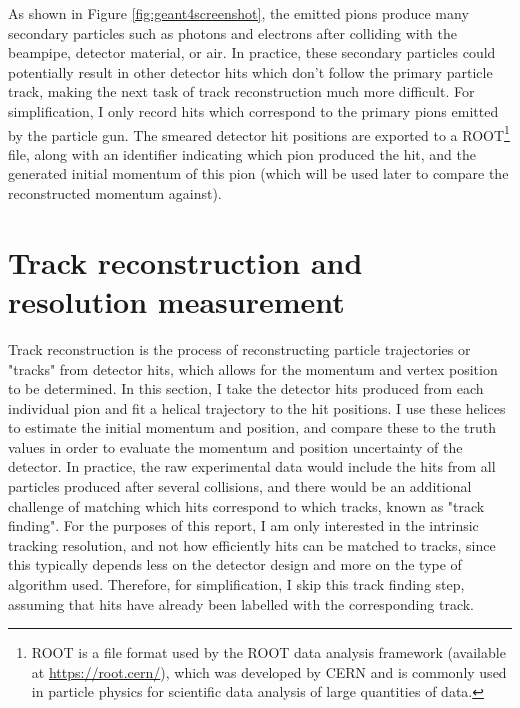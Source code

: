 \documentclass[titlepage]{article}[11pt]
\begin{document}
As shown in Figure \ref{fig:geant4screenshot}, the emitted pions produce many secondary particles such as photons and electrons after colliding with the beampipe, detector material, or air. In practice, these secondary particles could potentially result in other detector hits which don't follow the primary particle track, making the next task of track reconstruction much more difficult. For simplification, I only record hits which correspond to the primary pions emitted by the particle gun. The smeared detector hit positions are exported to a ROOT\footnote[5]{
	ROOT is a file format used by the ROOT data analysis framework (available at \url{https://root.cern/}), which was developed by CERN and is commonly used in particle physics for scientific data analysis of large quantities of data.
} file, along with an identifier indicating which pion produced the hit, and the generated initial momentum of this pion (which will be used later to compare the reconstructed momentum against). 

\section{Track reconstruction and resolution measurement}
Track reconstruction is the process of reconstructing particle trajectories or "tracks" from detector hits, which allows for the momentum and vertex position to be determined. In this section, I take the detector hits produced from each individual pion and fit a helical trajectory to the hit positions. I use these helices to estimate the initial momentum and position, and compare these to the truth values in order to evaluate the momentum and position uncertainty of the detector. In practice, the raw experimental data would include the hits from all particles produced after several collisions, and there would be an additional challenge of matching which hits correspond to which tracks, known as "track finding". For the purposes of this report, I am only interested in the intrinsic tracking resolution, and not how efficiently hits can be matched to tracks, since this typically depends less on the detector design and more on the type of algorithm used. Therefore, for simplification, I skip this track finding step, assuming that hits have already been labelled with the corresponding track.
\end{document}
